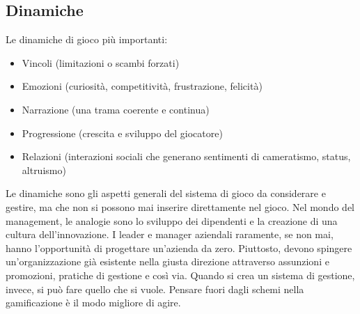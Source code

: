 \begin{itemize}
\subsection{Dinamiche}
  Le dinamiche di gioco più importanti:
  \begin{itemize}
    \item Vincoli (limitazioni o scambi forzati)
    \item Emozioni (curiosità, competitività, frustrazione, felicità)
    \item Narrazione (una trama coerente e continua)
    \item Progressione (crescita e sviluppo del giocatore)
    \item Relazioni (interazioni sociali che generano sentimenti di cameratismo, status, altruismo)
  \end{itemize}
  Le dinamiche sono gli aspetti generali del sistema di gioco da considerare e gestire, ma che non si possono mai inserire direttamente nel gioco. Nel mondo del management, le analogie sono lo sviluppo dei dipendenti e la creazione di una cultura dell'innovazione. I leader e manager aziendali raramente, se non mai, hanno l'opportunità di progettare un'azienda da zero. Piuttosto, devono spingere un'organizzazione già esistente nella giusta direzione attraverso assunzioni e promozioni, pratiche di gestione e così via. Quando si crea un sistema di gestione, invece, si può fare quello che si vuole. Pensare fuori dagli schemi nella gamificazione è il modo migliore di agire.

\end{itemize}
